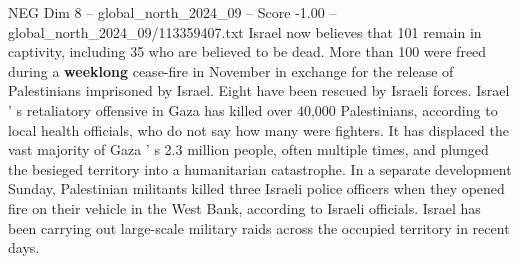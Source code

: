 \begin{textsample}{NEG Dim 8 – global\_north\_2024\_09 – Score -1.00 – global\_north\_2024\_09/113359407.txt}
Israel now believes that 101 remain in captivity, including 35 who are believed to be dead.
More than 100 were freed during a \textbf{weeklong} cease-fire in November in exchange for the release of Palestinians imprisoned by Israel.
Eight have been rescued by Israeli forces.
Israel ' s retaliatory offensive in Gaza has killed over 40,000 Palestinians, according to local health officials, who do not say how many were fighters.
It has displaced the vast majority of Gaza ' s 2.3 million people, often multiple times, and plunged the besieged territory into a humanitarian catastrophe.
In a separate development Sunday, Palestinian militants killed three Israeli police officers when they opened fire on their vehicle in the West Bank, according to Israeli officials.
Israel has been carrying out large-scale military raids across the occupied territory in recent days.

\end{textsample}
